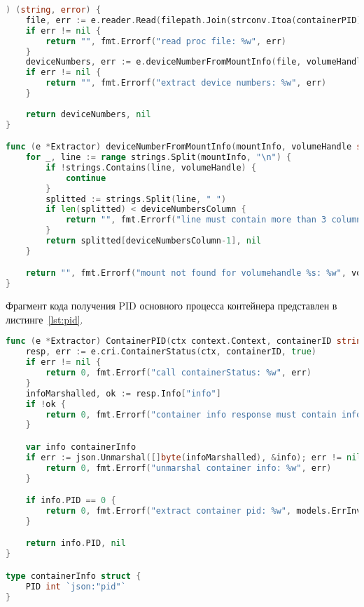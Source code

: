 \newpage

\begin{lstlisting}[language=Go,label=lst:proc_parse2, caption={Получение номеров устройства (продолжение листинга~\ref{lst:proc_parse1})}]
) (string, error) {
	file, err := e.reader.Read(filepath.Join(strconv.Itoa(containerPID), "mountinfo"))
	if err != nil {
		return "", fmt.Errorf("read proc file: %w", err)
	}
	deviceNumbers, err := e.deviceNumberFromMountInfo(file, volumeHandle)
	if err != nil {
		return "", fmt.Errorf("extract device numbers: %w", err)
	}
	
	return deviceNumbers, nil
}

func (e *Extractor) deviceNumberFromMountInfo(mountInfo, volumeHandle string) (string, error) {
	for _, line := range strings.Split(mountInfo, "\n") {
		if !strings.Contains(line, volumeHandle) {
			continue
		}
		splitted := strings.Split(line, " ")
		if len(splitted) < deviceNumbersColumn {
			return "", fmt.Errorf("line must contain more than 3 columns: %w (%q)", models.ErrInvalidProcFile, line)
		}
		return splitted[deviceNumbersColumn-1], nil
	}

	return "", fmt.Errorf("mount not found for volumehandle %s: %w", volumeHandle, models.ErrNoVolumeEntry)
}
\end{lstlisting}

Фрагмент кода получения PID основного процесса контейнера представлен в листинге~\ref{lst:pid}.

\newpage

\begin{lstlisting}[language=Go,label=lst:pid, caption={Получение PID основного процесса контейнера}]
func (e *Extractor) ContainerPID(ctx context.Context, containerID string) (int, error) {
	resp, err := e.cri.ContainerStatus(ctx, containerID, true)
	if err != nil {
		return 0, fmt.Errorf("call containerStatus: %w", err)
	}
	infoMarshalled, ok := resp.Info["info"]
	if !ok {
		return 0, fmt.Errorf("container info response must contain info block: %w", models.ErrInvalidContainerInfo)
	}

	var info containerInfo
	if err := json.Unmarshal([]byte(infoMarshalled), &info); err != nil {
		return 0, fmt.Errorf("unmarshal container info: %w", err)
	}

	if info.PID == 0 {
		return 0, fmt.Errorf("extract container pid: %w", models.ErrInvalidContainerInfo)
	}

	return info.PID, nil
}

type containerInfo struct {
	PID int `json:"pid"`
}
\end{lstlisting}

